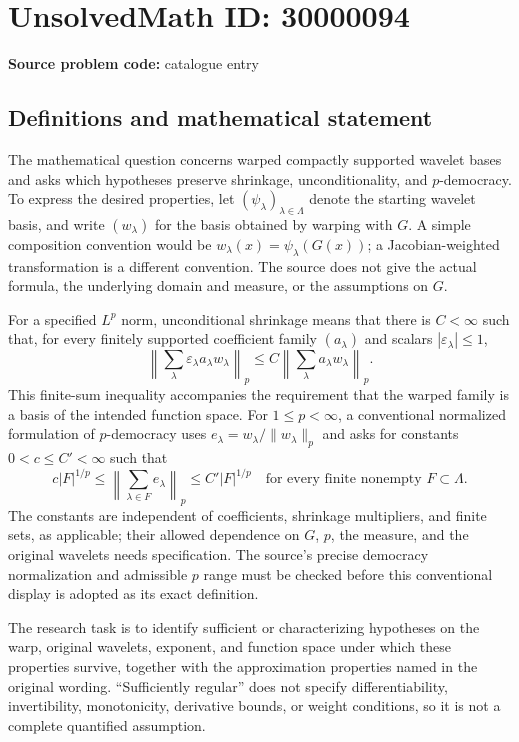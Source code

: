 \documentclass[11pt]{article}
\begin{document}
\section*{UnsolvedMath ID: 30000094}
\textbf{Source problem code:} catalogue entry
\subsection{Definitions and mathematical statement}
The mathematical question concerns warped compactly supported wavelet bases and asks which hypotheses preserve shrinkage, unconditionality, and \(p\)-democracy. To express the desired properties, let \((\psi_\lambda)_{\lambda\in\Lambda}\) denote the starting wavelet basis, and write \((w_\lambda)\) for the basis obtained by warping with \(G\). A simple composition convention would be \(w_\lambda(x)=\psi_\lambda(G(x))\); a Jacobian-weighted transformation is a different convention. The source does not give the actual formula, the underlying domain and measure, or the assumptions on \(G\).

For a specified \(L^p\) norm, unconditional shrinkage means that there is \(C<\infty\) such that, for every finitely supported coefficient family \((a_\lambda)\) and scalars \(|\varepsilon_\lambda|\leq1\),
\[
\left\|\sum_\lambda\varepsilon_\lambda a_\lambda w_\lambda\right\|_p
\leq C\left\|\sum_\lambda a_\lambda w_\lambda\right\|_p.
\]
This finite-sum inequality accompanies the requirement that the warped family is a basis of the intended function space. For \(1\leq p<\infty\), a conventional normalized formulation of \(p\)-democracy uses \(e_\lambda=w_\lambda/\|w_\lambda\|_p\) and asks for constants \(0<c\leq C'<\infty\) such that
\[
c|F|^{1/p}\leq\left\|\sum_{\lambda\in F}e_\lambda\right\|_p
\leq C'|F|^{1/p}
\quad\text{for every finite nonempty }F\subset\Lambda.
\]
The constants are independent of coefficients, shrinkage multipliers, and finite sets, as applicable; their allowed dependence on \(G\), \(p\), the measure, and the original wavelets needs specification. The source's precise democracy normalization and admissible \(p\) range must be checked before this conventional display is adopted as its exact definition.

The research task is to identify sufficient or characterizing hypotheses on the warp, original wavelets, exponent, and function space under which these properties survive, together with the approximation properties named in the original wording. ``Sufficiently regular'' does not specify differentiability, invertibility, monotonicity, derivative bounds, or weight conditions, so it is not a complete quantified assumption.
\end{document}
